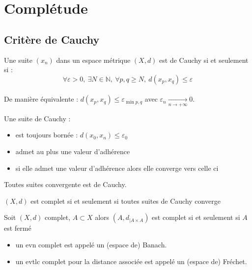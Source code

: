 \section{Complétude}
\subsection{Critère de Cauchy}

\begin{definition}
Une suite $(x_{n})$ dans un espace métrique $(X,d)$ est de Cauchy si et seulement si :
$$\forall \varepsilon >0,\ \exists N\in \mathbb{N} ,\ \forall p,q\ge N,\ d(x_p,x_q)\le \varepsilon $$\\
De manière équivalente : $d(x_p,x_q)\le \varepsilon _{\min p,q}$ avec $\varepsilon _n \xrightarrow[n\to +\infty]{} 0$.\\

\end{definition}

Une suite de Cauchy :
\begin{itemize}
    \item est toujours bornée : $d(x_0,x_n)\le \varepsilon _0$
    \item admet au plus une valeur d'adhérence
    \item si elle admet une valeur d'adhérence alors elle converge vers celle ci
\end{itemize}
Toutes suites convergente est de Cauchy.

\begin{definition}
    $(X,d)$ est complet si et seulement si toutes suites de Cauchy converge
\end{definition}
\begin{lemme}
    Soit $(X,d)$ complet, $A \subset X$ alors $(A,d_{|A\times A})$ est complet si et seulement si $A$ est fermé
\end{lemme}


\begin{remarque}
\begin{itemize}
    \item un evn complet est appelé un (espace de) Banach. \\
    
    \item un evtlc complet pour la distance associée est appelé un (espace de) Fréchet.
\end{itemize}
\end{remarque}

